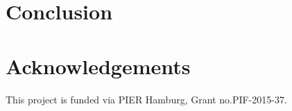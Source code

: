 \documentclass[a4paper,10pt]{article}
\newcommand*{\notFOREPJ}{}%
\begin{document}
\section{Conclusion}
\label{sec:conclusion}
\ifdefined\notFOREPJ
 
\else
 
\fi

\section*{Acknowledgements}
This project is funded via PIER Hamburg, Grant no.PIF-2015-37.






\end{document}
